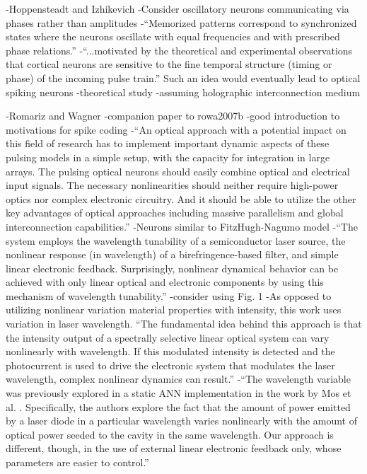 \cite{hoiz2000}
-Hoppensteadt and Izhikevich
-Consider oscillatory neurons communicating via phases rather than amplitudes
-``Memorized patterns correspond to synchronized states where the neurons oscillate with equal frequencies and with prescribed phase relations.''
-``...motivated by the theoretical and experimental observations that cortical neurons are sensitive to the fine temporal structure (timing or phase) of the incoming pulse train.'' Such an idea would eventually lead to optical spiking neurons
-theoretical study
-assuming holographic interconnection medium


\cite{rowa2007a}
-Romariz and Wagner
-companion paper to rowa2007b
-good introduction to motivations for spike coding
-``An optical approach with a potential impact on this field of research has to implement important dynamic aspects of these pulsing models in a simple setup, with the capacity for integration in large arrays. The pulsing optical neurons should easily combine optical and electrical input signals. The necessary nonlinearities should neither require high-power optics nor complex electronic circuitry. And it should be able to utilize the other key advantages of optical approaches including massive parallelism and global interconnection capabilities.''
-Neurons similar to FitzHugh-Nagumo model
-``The system employs the wavelength tunability of a semiconductor laser source, the nonlinear response (in wavelength) of a birefringence-based filter, and simple linear electronic feedback. Surprisingly, nonlinear dynamical behavior can be achieved with only linear optical and electronic components by using this mechanism of wavelength tunability.''
-consider using Fig. 1
-As opposed to utilizing nonlinear variation material properties with intensity, this work uses variation in laser wavelength. ``The fundamental idea behind this approach is that the intensity output of a spectrally selective linear optical system can vary nonlinearly with wavelength. If this modulated intensity is detected and the photocurrent is used to drive the electronic system that modulates the laser wavelength, complex nonlinear dynamics can result.''
-``The wavelength variable was previously explored in a static ANN implementation in the work by Mos et al. \cite{moju2000}. Specifically, the authors explore the fact that the amount of power emitted by a laser diode in a particular wavelength varies nonlinearly with the amount of optical power seeded to the cavity in the same wavelength. Our approach is different, though, in the use of external linear electronic feedback only, whose parameters are easier to control.''
